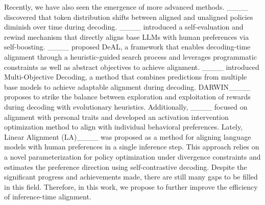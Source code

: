 Recently, we have also seen the emergence of more advanced methods. ____ discovered that token distribution shifts between aligned and unaligned policies diminish over time during decoding. ____ introduced a self-evaluation and rewind mechanism that directly aligns base LLMs with human preferences via self-boosting. ____ proposed DeAL, a framework that enables decoding-time alignment through a heuristic-guided search process and leverages programmatic constraints as well as abstract objectives to achieve alignment. ____ introduced Multi-Objective Decoding, a method that combines predictions from multiple base models to achieve adaptable alignment during decoding.  DARWIN____ proposes to strike the balance between exploration and exploitation of rewards during decoding with evolutionary heuristics. Additionally, ____ focused on alignment with personal traits and developed an activation intervention optimization method to align with individual behavioral preferences. Lately, Linear Alignment (LA)____ was proposed as a method for aligning language models with human preferences in a single inference step. This approach relies on a novel parameterization for policy optimization under divergence constraints and estimates the preference direction using self-contrastive decoding.
	Despite the significant progress and achievements made, there are still many gaps to be filled in this field. Therefore, in this work, we propose \modelname{} to further
	improve the efficiency of inference-time alignment.